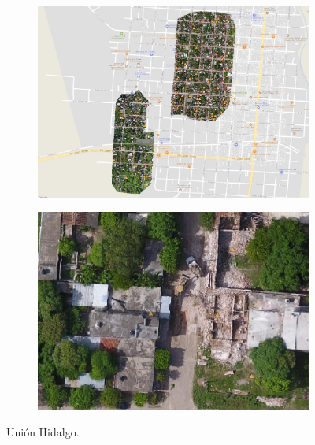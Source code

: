 \begin{figure}[!h]
  \centering
    \begin{subfigure}{.9\textwidth}
        \includegraphics[width=\textwidth]{images/union-ortho.jpg}
    \end{subfigure}
    \begin{subfigure}{.9\textwidth}
        \includegraphics[width=\textwidth]{images/union-example.jpg}
    \end{subfigure}
  \caption{Uni\'on Hidalgo.}
  \label{fig:union}
\end{figure}


